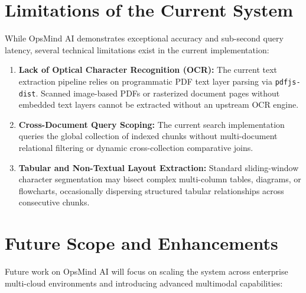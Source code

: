 \section{Limitations of the Current System}
\label{sec:concl_limitations}

While OpsMind AI demonstrates exceptional accuracy and sub-second query latency, several technical limitations exist in the current implementation:

\begin{enumerate}
    \item \textbf{Lack of Optical Character Recognition (OCR):} The current text extraction pipeline relies on programmatic PDF text layer parsing via \texttt{pdfjs-dist}. Scanned image-based PDFs or rasterized document pages without embedded text layers cannot be extracted without an upstream OCR engine.
    \item \textbf{Cross-Document Query Scoping:} The current search implementation queries the global collection of indexed chunks without multi-document relational filtering or dynamic cross-collection comparative joins.
    \item \textbf{Tabular and Non-Textual Layout Extraction:} Standard sliding-window character segmentation may bisect complex multi-column tables, diagrams, or flowcharts, occasionally dispersing structured tabular relationships across consecutive chunks.
\end{enumerate}

\section{Future Scope and Enhancements}
\label{sec:concl_future_scope}

Future work on OpsMind AI will focus on scaling the system across enterprise multi-cloud environments and introducing advanced multimodal capabilities:

